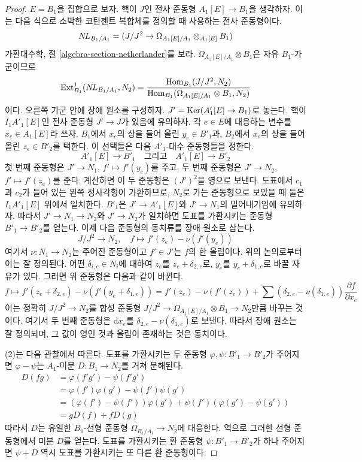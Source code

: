 \begin{proof}
$E=B_1$을 집합으로 보자. 핵이 $J$인 전사 준동형
$A_1[E] \to B_1$을 생각하자. 이는 다음 식으로 소박한 코탄젠트
복합체를 정의할 때 사용하는 전사 준동형이다.
$$
\mathop{N\!L}\nolimits_{B_1/A_1} = (J/J^2 \to \Omega_{A_1[E]/A_1} \otimes_{A_1[E]} B_1)
$$
가환대수학, 절 \ref{algebra-section-netherlander}를 보라.
$\Omega_{A_1[E]/A_1} \otimes B_1$은 자유 $B_1$-가군이므로
$$
\mathop{\mathrm{Ext}}\nolimits^1_{B_1}(\mathop{N\!L}\nolimits_{B_1/A_1}, N_2) =
\frac{\mathop{\mathrm{Hom}}\nolimits_{B_1}(J/J^2, N_2)}
{\mathop{\mathrm{Hom}}\nolimits_{B_1}(\Omega_{A_1[E]/A_1} \otimes B_1, N_2)}
$$
이다. 오른쪽 가군 안에 장애 원소를 구성하자.
$J'=\mathop{\mathrm{Ker}}(A'_1[E]\to B_1)$로 놓는다. 핵이 $I_1A'_1[E]$인
전사 준동형 $J'\to J$가 있음에 유의하자. 각 $e\in E$에 대응하는
변수를 $x_e\in A_1[E]$라 쓰자. $B_1$에서 $x_e$의 상을 들어 올린
$y_e\in B'_1$과, $B_2$에서 $x_e$의 상을 들어 올린
$z_e\in B'_2$를 택한다. 이 선택들은 다음 $A'_1$-대수 준동형들을 정한다.
$$
A'_1[E] \to B'_1 \quad\text{그리고}\quad A'_1[E] \to B'_2
$$
첫 번째 준동형은 $J'\to N_1$, $f'\mapsto f'(y_e)$를 주고,
두 번째 준동형은 $J'\to N_2$, $f'\mapsto f'(z_e)$를 준다.
계산하면 이 두 준동형은 $(J')^2$을 영으로 보낸다. 도표에서
$c_1$과 $c_2$가 들어 있는 왼쪽 정사각형이 가환하므로, $N_2$로 가는
준동형으로 보았을 때 둘은 $I_1A'_1[E]$ 위에서 일치한다.
$B'_1$은 $J'\to A'_1[E]$와 $J'\to N_1$의 밀어내기임에 유의하자.
따라서 $J'\to N_1\to N_2$와 $J'\to N_2$가 일치하면 도표를
가환시키는 준동형 $B'_1\to B'_2$를 얻는다. 이제 다음 준동형의
동치류를 장애 원소로 삼는다.
$$
J/J^2 \to N_2,\quad f \mapsto f'(z_e) - \nu(f'(y_e))
$$
여기서 $\nu:N_1\to N_2$는 주어진 준동형이고 $f'\in J'$는 $f$의
한 올림이다. 위의 논의로부터 이는 잘 정의된다. 어떤
$\delta_{i,e}\in N_i$에 대하여 $z_e$를 $z_e+\delta_{2,e}$로,
$y_e$를 $y_e+\delta_{1,e}$로 바꿀 자유가 있다. 그러면 위 준동형은
다음과 같이 바뀐다.
$$
f \mapsto f'(z_e + \delta_{2, e}) - \nu(f'(y_e + \delta_{1, e})) =
f'(z_e) - \nu(f'(z_e)) +
\sum (\delta_{2, e} - \nu(\delta_{1, e}))\frac{\partial f}{\partial x_e}
$$
이는 정확히 $J/J^2\to N_2$를 합성 준동형
$J/J^2\to\Omega_{A_1[E]/A_1}\otimes B_1\to N_2$만큼 바꾸는 것이다.
여기서 두 번째 준동형은 $\text{d}x_e$를
$\delta_{2,e}-\nu(\delta_{1,e})$로 보낸다. 따라서 장애 원소는
잘 정의되며, 그 값이 영인 것과 올림이 존재하는 것은 동치이다.

\medskip\noindent
(2)는 다음 관찰에서 따른다. 도표를 가환시키는 두 준동형
$\varphi,\psi:B'_1\to B'_2$가 주어지면 $\varphi-\psi$는
$A_1$-미분 $D:B_1\to N_2$를 거쳐 분해된다.
\begin{align*}
D(fg) & = \varphi(f'g') - \psi(f'g') \\
& =
\varphi(f')\varphi(g') - \psi(f')\psi(g') \\
& =
(\varphi(f') - \psi(f'))\varphi(g') + \psi(f')(\varphi(g') - \psi(g')) \\
& =
gD(f) + fD(g)
\end{align*}
따라서 $D$는 유일한 $B_1$-선형 준동형
$\Omega_{B_1/A_1}\to N_2$에 대응한다. 역으로 그러한 선형 준동형에서
미분 $D$를 얻는다. 도표를 가환시키는 환 준동형
$\psi:B'_1\to B'_2$가 하나 주어지면 $\psi+D$ 역시 도표를
가환시키는 또 다른 환 준동형이다.
\end{proof}

